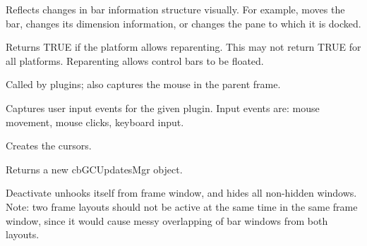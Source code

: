 \label{wxframelayoutapplybarproperties}


Reflects changes in bar information structure visually.
For example, moves the bar, changes its dimension information,
or changes the pane to which it is docked.


\label{wxframelayoutcanreparent}


Returns TRUE if the platform allows reparenting. This may not return TRUE
for all platforms. Reparenting allows control bars to be floated.


\label{wxframelayoutcaptureeventsforpane}


Called by plugins; also captures the mouse in the parent frame.


\label{wxframelayoutcaptureeventsforplugin}


Captures user input events for the given plugin.
Input events are: mouse movement, mouse clicks, keyboard input.


\label{wxframelayoutcreatecursors}


Creates the cursors.


\label{wxframelayoutcreateupdatesmanager}


Returns a new cbGCUpdatesMgr object.


\label{wxframelayoutdeactivate}


Deactivate unhooks itself from frame window, and hides all non-hidden windows.
Note: two frame layouts should not be active at the same time in the
same frame window, since it would cause messy overlapping of bar windows
from both layouts.


\label{wxframelayoutdestroybarwindows}

